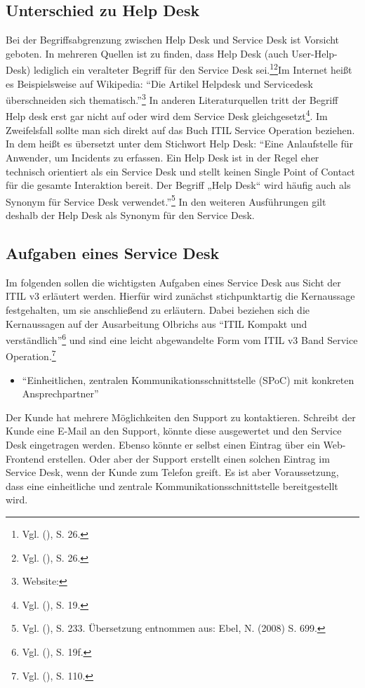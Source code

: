 \subsection{Unterschied zu Help Desk}
\noindent
Bei der Begriffsabgrenzung zwischen Help Desk und Service Desk ist Vorsicht geboten. In mehreren Quellen ist zu finden, dass Help Desk (auch User-Help-Desk) lediglich ein veralteter Begriff für den Service Desk sei.\footnote{Vgl. \citeauthor{Buchsein} (\citeyear{Buchsein}), S. 26.}\footnote{Vgl. \citeauthor{Meier} (\citeyear{Meier}), S. 26.}Im Internet heißt es Beispielsweise auf Wikipedia: \enquote{Die Artikel Helpdesk und Servicedesk überschneiden sich thematisch.}\footnote{Website:\cite{WikiServiceDesk}} In anderen Literaturquellen tritt der Begriff Help desk erst gar nicht auf oder wird dem Service Desk gleichgesetzt\footnote{Vgl. \citeauthor{Olbrich} (\citeyear{Olbrich}), S. 19.}. Im Zweifelsfall sollte man sich direkt auf das Buch ITIL Service Operation beziehen. In dem heißt es übersetzt unter dem Stichwort Help Desk:
\enquote{Eine Anlaufstelle für Anwender, um Incidents zu erfassen. Ein Help Desk ist in der
Regel eher technisch orientiert als ein Service Desk und stellt keinen Single Point
of Contact für die gesamte Interaktion bereit. Der Begriff „Help Desk“ wird häufig
auch als Synonym für Service Desk verwendet.}\footnote{Vgl. \citeauthor{Cannon} (\citeyear{Cannon}), S. 233. Übersetzung entnommen aus: Ebel, N. (2008) S. 699.} \newline
In den weiteren Ausführungen gilt deshalb der Help Desk als Synonym für den Service Desk.

\newpage


\subsection{Aufgaben eines Service Desk}

\noindent
Im folgenden sollen die wichtigsten Aufgaben eines Service Desk aus Sicht der ITIL v3 erläutert werden. Hierfür wird zunächst stichpunktartig die Kernaussage festgehalten, um sie anschließend zu erläutern. Dabei beziehen sich die Kernaussagen auf der Ausarbeitung Olbrichs aus \enquote{ITIL Kompakt und verständlich}\footnote{Vgl. \citeauthor{Olbrich} (\citeyear{Olbrich}), S. 19f.}
und sind eine leicht abgewandelte Form vom ITIL v3 Band Service Operation.\footnote{Vgl. \citeauthor{Cannon} (\citeyear{Cannon}), S. 110.}

\begin{itemize}
\item \enquote{Einheitlichen, zentralen Kommunikationsschnittstelle (SPoC) mit konkreten Ansprechpartner}
\end{itemize}
\noindent
Der Kunde hat mehrere Möglichkeiten den Support zu kontaktieren. Schreibt der Kunde eine E-Mail an den Support, könnte diese ausgewertet und den Service Desk eingetragen werden. Ebenso könnte er selbst einen Eintrag über ein Web-Frontend erstellen. Oder aber der Support erstellt einen solchen Eintrag im Service Desk, wenn der Kunde zum Telefon greift. Es ist aber Voraussetzung, dass eine einheitliche und zentrale Kommunikationsschnittstelle bereitgestellt wird.


